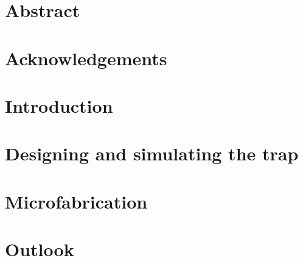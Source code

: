 \documentclass[a4paper, 12pt, twoside]{report}
\newcommand{\thesis}[1]{\textcolor{pink}{#1}} %
\renewcommand{\thesis}[1]{} %
\begin{document}


\chapter*{Abstract}

\clearpage

\tableofcontents
\clearpage

\setcounter{page}{5} 


\chapter*{Acknowledgements}
\thesis{This should go to the top}


\chapter{Introduction}
\label{intro}
\thesis{

}


\chapter{Designing and simulating the trap}
\label{design}


\thesis{
\chapter{Microwaves on a chip}
\thesis{Maybe this can be more like theory of molecule-microwave
interaction, something that I can work on in the quarrantine?}

}

\chapter{Microfabrication}
\label{fab}


\thesis{
\chapter{Trapping molecules on a chip}
\chapter{Coherent control of molecules on a chip}
}

\chapter{Outlook}
\label{outlook}


\clearpage




\end{document}
